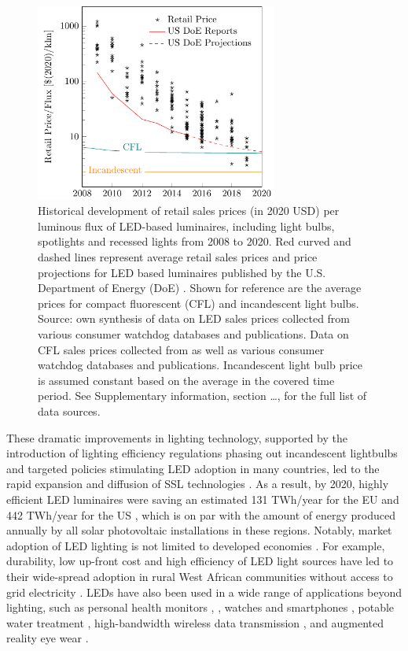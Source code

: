 \documentclass[twoside,twocolumn,9pt]{article}
\begin{document}
\begin{figure}
\centering
  \includegraphics[height=6.5cm]{2_SSL_EES/article/figures/cost_lamp_small.pdf}
  \caption{Historical development of retail sales prices (in 2020 USD) per luminous flux of LED-based luminaires, including light bulbs, spotlights and recessed lights from 2008 to 2020. Red curved and dashed lines represent average retail sales prices and price projections for LED based luminaires published by the U.S. Department of Energy (DoE) \cite{council2013assessment}. Shown for reference are the average prices for compact fluorescent (CFL) and incandescent light bulbs. Source: own synthesis of data on LED sales prices collected from various consumer watchdog databases and publications. Data on CFL sales prices collected from \cite{eger2018origin} as well as various consumer watchdog databases and publications. Incandescent light bulb price is assumed constant based on the average in the covered time period. See Supplementary information, section …, for the full list of data sources.}
  \label{fgr:cost_lamp_small}
\end{figure}

These  dramatic improvements in lighting technology, supported by the introduction of lighting efficiency regulations phasing out incandescent lightbulbs and targeted policies stimulating LED adoption in many countries, led to the rapid expansion and diffusion of SSL technologies  \cite{weinold2020long}\cite{Mills2014}\cite{Stegmaier2021}\cite{grubb2021new}. As a result, by 2020, highly efficient LED luminaires were saving an estimated 131 TWh/year for the EU \cite{eu2019impactass} and 442 TWh/year for the US \cite{guidehouse2020adoption}, which is on par with the amount of energy produced annually by all solar photovoltaic installations in these regions. Notably, market adoption of LED lighting is not limited to developed economies \cite{Kamat2020}. For example, durability, low up-front cost and high efficiency of LED light sources have led to their wide-spread adoption in rural West African communities without access to grid electricity \cite{Bensch2017}. LEDs have also been used in a wide range of applications beyond lighting, such as personal health monitors \cite{o2019optical}, \cite{Wyatt2020}, watches and smartphones \cite{Bai2017}, potable water treatment \cite{Lui2014}, high-bandwidth wireless data transmission \cite{Haas2016}, and augmented reality eye wear \cite{Lee2016}. 
\end{document}
